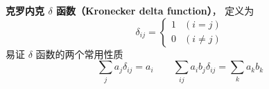 
\begin{issues}
\end{issues}

\textbf{克罗内克 $\delta$ 函数（Kronecker delta function）}， 定义为
\begin{equation}\label{Kronec_eq2}
\delta_{ij} =
\begin{cases}
1 & (i = j)\\
0 & (i \ne j)
\end{cases}
\end{equation}
易证 $\delta$ 函数的两个常用性质
\begin{equation}
\sum_j a_j \delta_{ij} = a_i
\qquad
\sum_{ij} a_i b_j \delta_{ij} = \sum_k a_k b_k
\end{equation}
